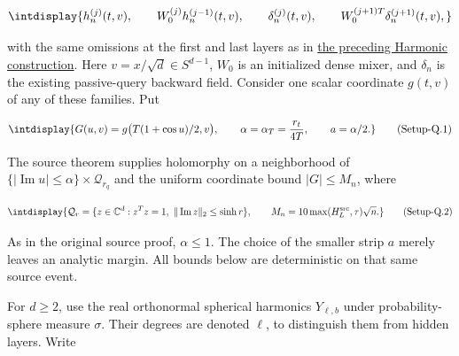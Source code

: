\begingroup\renewcommand{\theHequation}{intdisplay.868}
\begin{equation*}
\intdisplay{
h_n^{(j)}(t,v),\qquad
W_0^{(j)}h_n^{(j-1)}(t,v),\qquad
\delta_n^{(j)}(t,v),\qquad
W_0^{(j+1)T}\delta_n^{(j+1)}(t,v),
}
\end{equation*}
\endgroup


with the same omissions at the first and last layers as in \hyperref[int:harmonic-construction]{the preceding Harmonic construction}. Here \(v=x/\sqrt d\in S^{d-1}\), \(W_0\) is an initialized dense mixer, and \(\delta_n\) is the existing passive-query backward field. Consider one scalar coordinate \(g(t,\allowbreak v)\) of any of these families. Put


\label{int:eq-setup-q-1}
\begingroup\renewcommand{\theHequation}{intdisplay.869}
\begin{equation}
\intdisplay{
G(u,v)=g\bigl(T(1+\cos u)/2,v\bigr),\qquad
\alpha=\alpha_T=\frac{r_t}{4T},\qquad a=\alpha/2.
}
\tag{Setup-Q.1}
\label{int:eq-0422-setup-q-1}
\end{equation}
\endgroup


The source theorem supplies holomorphy on a neighborhood of \(\{|\operatorname{Im}u|\le\alpha\}\times\mathcal Q_{r_q}\) and the uniform coordinate bound \(|G|\le M_n\), where


\label{int:eq-setup-q-2}
\begingroup\renewcommand{\theHequation}{intdisplay.870}
\begin{equation}
\intdisplay{
\mathcal Q_r=
\{z\in\mathbb C^d:z^Tz=1,\ \|\operatorname{Im}z\|_2\le\sinh r\},
\qquad M_n=10\max(H_L^{\rm src},\tau)\sqrt n.
}
\tag{Setup-Q.2}
\label{int:eq-0423-setup-q-2}
\end{equation}
\endgroup


As in the original source proof, \(\alpha\le1\). The choice of the smaller strip \(a\) merely leaves an analytic margin. All bounds below are deterministic on that same source event.



For \(d\ge2\), use the real orthonormal spherical harmonics \(Y_{\ell,\allowbreak b}\) under probability-sphere measure \(\sigma\). Their degrees are denoted \(\ell\), to distinguish them from hidden layers. Write


